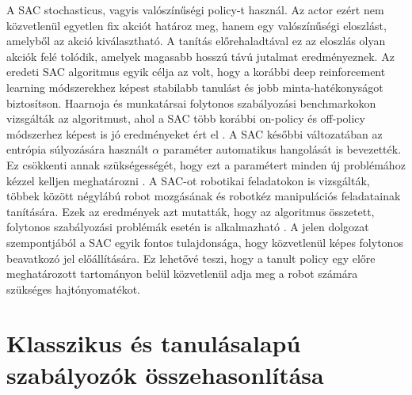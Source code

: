 \documentclass[12pt,a4paper]{report}
\begin{document}
	A SAC stochasticus, vagyis valószínűségi policy-t használ. Az actor ezért nem közvetlenül egyetlen fix akciót határoz meg, hanem egy valószínűségi eloszlást, amelyből az akció kiválasztható. A tanítás előrehaladtával ez az eloszlás olyan akciók felé tolódik, amelyek magasabb hosszú távú jutalmat eredményeznek.
	\newline
	\newline
	Az eredeti SAC algoritmus egyik célja az volt, hogy a korábbi deep reinforcement learning módszerekhez képest stabilabb tanulást és jobb minta-hatékonyságot biztosítson. Haarnoja és munkatársai folytonos szabályozási benchmarkokon vizsgálták az algoritmust, ahol a SAC több korábbi on-policy és off-policy módszerhez képest is jó eredményeket ért el \cite{haarnoja2018sac}.
	\newline
	\newline
	A SAC későbbi változatában az entrópia súlyozására használt $\alpha$ paraméter automatikus hangolását is bevezették. Ez csökkenti annak szükségességét, hogy ezt a paramétert minden új problémához kézzel kelljen meghatározni \cite{haarnoja2018applications}.
	A SAC-ot robotikai feladatokon is vizsgálták, többek között négylábú robot mozgásának és robotkéz manipulációs feladatainak tanítására. Ezek az eredmények azt mutatták, hogy az algoritmus összetett, folytonos szabályozási problémák esetén is alkalmazható \cite{haarnoja2018applications}.
	\newline
	\newline
	A jelen dolgozat szempontjából a SAC egyik fontos tulajdonsága, hogy közvetlenül képes folytonos beavatkozó jel előállítására. Ez lehetővé teszi, hogy a tanult policy egy előre meghatározott tartományon belül közvetlenül adja meg a robot számára szükséges hajtónyomatékot.
	\section{Klasszikus és tanulásalapú szabályozók összehasonlítása}
\end{document}

